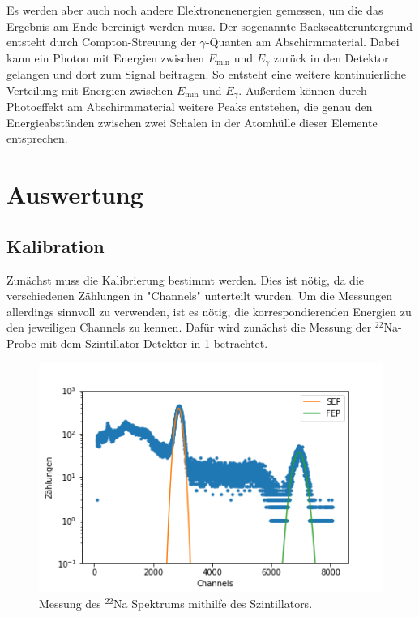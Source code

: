 Es werden aber auch noch andere Elektronenenergien gemessen, um die das Ergebnis am Ende bereinigt werden muss. Der sogenannte Backscatteruntergrund entsteht durch Compton-Streuung der $\gamma$-Quanten am Abschirmmaterial. Dabei kann ein Photon mit Energien zwischen $E_\text{min}$ und $E_\gamma$ zurück in den Detektor gelangen und dort zum Signal beitragen. So entsteht eine weitere kontinuierliche Verteilung mit Energien zwischen $E_\text{min}$ und $E_\gamma$. Außerdem können durch Photoeffekt am Abschirmmaterial weitere Peaks entstehen, die genau den Energieabständen zwischen zwei Schalen in der Atomhülle dieser Elemente entsprechen.


\section{Auswertung}
\subsection{Kalibration}
Zunächst muss die Kalibrierung bestimmt werden. Dies ist nötig, da die verschiedenen Zählungen in "Channels" unterteilt wurden. Um die Messungen allerdings sinnvoll zu verwenden, ist es nötig, die korrespondierenden Energien zu den jeweiligen Channels zu kennen. Dafür wird zunächst die Messung der $^{22}$Na-Probe mit dem Szintillator-Detektor in \cref{Kali} betrachtet.

\begin{figure}[ht]
	\centering
	\includegraphics[scale=0.8]{na.png}
	\caption{Messung des $^{22}$Na Spektrums mithilfe des Szintillators.}
	\label{Kali}
\end{figure}

